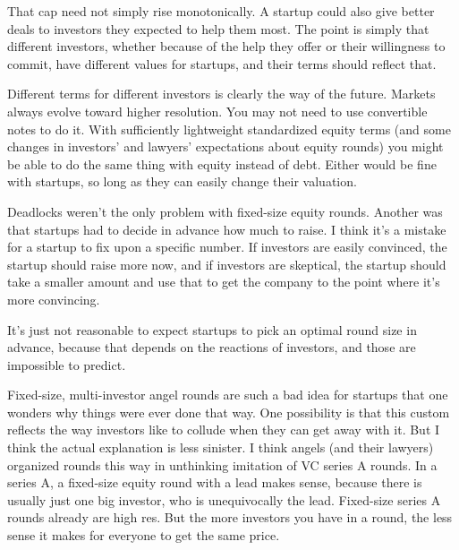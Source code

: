 That cap need not simply rise
                    monotonically. A startup could also give better deals to
                    investors they expected to help them most. The point is
                    simply that different investors, whether because of the help
                    they offer or their willingness to commit, have different
                    values for startups, and their terms should reflect that.

Different
                    terms for different investors is clearly the way of the
                    future. Markets always evolve toward higher resolution. You
                    may not need to use convertible notes to do it. With
                    sufficiently lightweight standardized equity terms (and some
                    changes in investors' and lawyers' expectations about equity
                    rounds) you might be able to do the same thing with equity
                    instead of debt. Either would be fine with startups, so long
                    as they can easily change their valuation.

Deadlocks
                    weren't the only problem with fixed-size equity rounds.
                    Another was that startups had to decide in advance how much
                    to raise. I think it's a mistake for a startup to fix upon a
                    specific number. If investors are easily convinced, the
                    startup should raise more now, and if investors are
                    skeptical, the startup should take a smaller amount and use
                    that to get the company to the point where it's more
                    convincing.

It's just not reasonable to expect
                    startups to pick an optimal round size in advance, because
                    that depends on the reactions of investors, and those are
                    impossible to predict.

Fixed-size, multi-investor
                    angel rounds are such a bad idea for startups that one
                    wonders why things were ever done that way. One possibility
                    is that this custom reflects the way investors like to
                    collude when they can get away with it. But I think the
                    actual explanation is less sinister. I think angels (and
                    their lawyers) organized rounds this way in unthinking
                    imitation of VC series A rounds. In a series A, a fixed-size
                    equity round with a lead makes sense, because there is
                    usually just one big investor, who is unequivocally the
                    lead. Fixed-size series A rounds already are high res. But
                    the more investors you have in a round, the less sense it
                    makes for everyone to get the same price.

